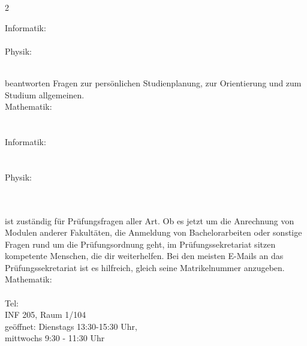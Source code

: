 \begin{multicols}{2}
\begin{description}
    Informatik: \studiendekaninformatik \\
    \email{\studiendekaninformatikemail} \\
    
    Physik: \studiendekanphysik \\
    \email{\studiendekanphysikemail} \\
   
    
	
    \item[Die Studienberaterinnen] beantworten Fragen zur persönlichen Studienplanung, zur Orientierung und zum Studium allgemeinen.\\
    
    Mathematik: \studienberatungmathe \\
    \studienberatungmatheraum \\
    \email{\studienberatungmatheemail} \\
    
    Informatik: \studienberatunginformatik\\
    \studienberatunginformatikraum \\
    \email{\studienberatunginformatikemail} \\
    
    Physik: \studienberatungphysikersti\\
    \studienberatungphysikraum \\
    \email{\studienberatungphysikemail}\\

	
    \item[Das Prüfungssekretariat] \label{pruefsek}ist zuständig für Prüfungsfragen aller Art. Ob es jetzt um die Anrechnung von Modulen anderer Fakultäten, die Anmeldung von Bachelorarbeiten oder sonstige Fragen rund um die Prüfungsordnung geht, im Prüfungssekretariat sitzen kompetente Menschen, die dir weiterhelfen. Bei den meisten E-Mails an das Prüfungssekretariat ist es hilfreich, gleich seine Matrikelnummer anzugeben. \\
    
    Mathematik: \pruefsekmathe \\
    \email{\pruefsekmatheemail}\\
    Tel: \pruefsekmathetel\\
    \gls{INF} 205, Raum 1/104\\
    geöffnet: Dienstags 13:30-15:30 Uhr,\\ mittwochs 9:30 - 11:30 Uhr\\
    

\end{description}
\end{multicols}
